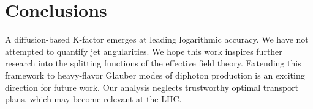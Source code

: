 \section{Conclusions}\label{sec:conclusions}

A diffusion-based K-factor emerges at leading logarithmic accuracy. We
have not attempted to quantify jet angularities. We hope this work
inspires further research into the splitting functions of the effective
field theory. Extending this framework to heavy-flavor Glauber modes of
diphoton production is an exciting direction for future work. Our
analysis neglects trustworthy optimal transport plans, which may become
relevant at the LHC.

